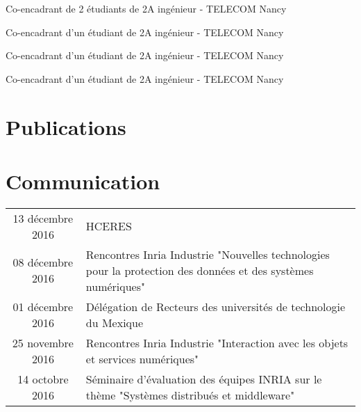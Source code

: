\documentclass[]{deedy-resume-openfont}
\begin{document}
\descript{}
Co-encadrant de 2 étudiants de 2A ingénieur - TELECOM Nancy
\sectionsep

\descript{}
Co-encadrant d'un étudiant de 2A ingénieur - TELECOM Nancy
\sectionsep

\descript{}
Co-encadrant d'un étudiant de 2A ingénieur - TELECOM Nancy
\sectionsep

\descript{}
Co-encadrant d'un étudiant de 2A ingénieur - TELECOM Nancy
\sectionsep


\section{Publications}
\renewcommand\refname{\vskip -1.5cm} %


\nocite{*}


\section{Communication}

\descript{}
\begin{tabular}{cp{150mm}}
13 décembre 2016       & HCERES\\
08 décembre 2016       & Rencontres Inria Industrie "Nouvelles technologies pour la protection des données et des systèmes numériques"\\
01 décembre 2016       & Délégation de Recteurs des universités de technologie du Mexique\\
25 novembre 2016       & Rencontres Inria Industrie "Interaction avec les objets et services numériques"\\
14 octobre 2016        & Séminaire d'évaluation des équipes INRIA sur le thème "Systèmes distribués et middleware"\\
\end{tabular}
\sectionsep
\end{document}
